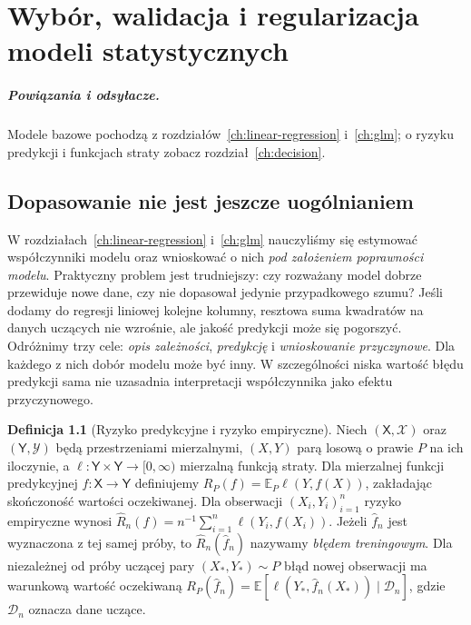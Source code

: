 \documentclass[11pt,a4paper,oneside]{report}
\numberwithin{equation}{chapter}
\theoremstyle{plain}
\theoremstyle{definition}
\newtheorem{definicja}{Definicja}[chapter]
\theoremstyle{remark}
\newcommand{\E}{\mathbb E}
\begin{document}
\chapter{Wybór, walidacja i regularizacja modeli statystycznych}
\label{ch:model-selection}
\paragraph{Powiązania i odsyłacze.} Modele bazowe pochodzą z rozdziałów~\ref{ch:linear-regression} i~\ref{ch:glm}; o ryzyku predykcji i funkcjach straty zobacz rozdział~\ref{ch:decision}.


\section{Dopasowanie nie jest jeszcze uogólnianiem}
W rozdziałach~\ref{ch:linear-regression} i~\ref{ch:glm} nauczyliśmy się
estymować współczynniki modelu oraz wnioskować o nich \emph{pod założeniem
poprawności modelu}. Praktyczny problem jest trudniejszy: czy rozważany
model dobrze przewiduje nowe dane, czy nie dopasował jedynie przypadkowego
szumu? Jeśli dodamy do regresji liniowej kolejne kolumny, resztowa suma
kwadratów na danych uczących nie wzrośnie, ale jakość predykcji może się
pogorszyć. Odróżnimy trzy cele: \emph{opis zależności}, \emph{predykcję}
i \emph{wnioskowanie przyczynowe}. Dla każdego z nich dobór modelu może być
inny. W szczególności niska wartość błędu predykcji sama nie uzasadnia
interpretacji współczynnika jako efektu przyczynowego.

\begin{definicja}[Ryzyko predykcyjne i ryzyko empiryczne]
\label{def:predictive-risk}
Niech $(\mathsf X,\mathcal X)$ oraz $(\mathsf Y,\mathcal Y)$
będą przestrzeniami mierzalnymi, $(X,Y)$ parą losową
o prawie $P$ na ich iloczynie, a
$\ell:\mathsf Y\times\mathsf Y\to[0,\infty)$ mierzalną funkcją
straty. Dla mierzalnej funkcji predykcyjnej
$f:\mathsf X\to\mathsf Y$ definiujemy
$R_P(f)=\E_P\ell(Y,f(X))$, zakładając skończoność wartości oczekiwanej.
Dla obserwacji $(X_i,Y_i)_{i=1}^n$ ryzyko empiryczne wynosi
$\widehat R_n(f)=n^{-1}\sum_{i=1}^n\ell(Y_i,f(X_i))$.
Jeżeli $\widehat f_n$ jest wyznaczona z tej samej próby, to
$\widehat R_n(\widehat f_n)$ nazywamy \emph{błędem treningowym}.
Dla niezależnej od próby uczącej pary $(X_*,Y_*)\sim P$ błąd
nowej obserwacji ma warunkową wartość oczekiwaną
$R_P(\widehat f_n)=\E[\ell(Y_*,\widehat f_n(X_*))\mid\mathcal D_n]$,
gdzie $\mathcal D_n$ oznacza dane uczące.
\end{definicja}
\end{document}

